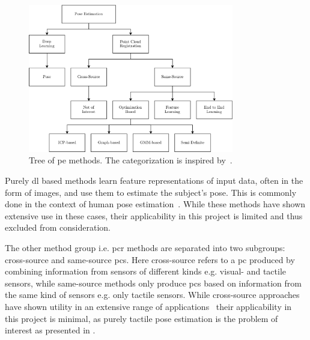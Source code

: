 \begin{figure}[h]
	\begin{small}
		\begin{center}
			\includegraphics[width=0.8\textwidth]{chapters/state-of-the-art/fig/pe-categories-v3.pdf}
		\end{center}
		\caption{Tree of \gls{pe} methods. The categorization is inspired by~\cite{a-comprehensive-survey-on-point-cloud-registration}.}
		\label{fig:pe-categories}
	\end{small}
\end{figure}

Purely \gls{dl} based methods learn feature representations of input data, often in the form of images, and use them to estimate the subject's pose. This is commonly done in the context of human pose estimation~\cite{hands-deep-in-deep-learning-for-hand-pose-estimation, deeppose:-human-pose-estimation-via-deep-neural-networks, deeplabcut:-markerless-pose-estimation-of-user-defined-body-parts-with-deep-learning}. While these methods have shown extensive use in these cases, their applicability in this project is limited and thus excluded from consideration. \medskip

The other method group i.e. \gls{pcr} methods are separated into two subgroups: cross-source and same-source \gls{pc}s. Here cross-source refers to a \gls{pc} produced by combining information from sensors of different kinds e.g. visual- and tactile sensors, while same-source methods only produce \gls{pc}s based on information from the same kind of sensors e.g. only tactile sensors. 
While cross-source approaches have shown utility in an extensive range of applications~\cite{a-systematic-approach-for-cross-source-point-cloud-registration-by-preserving-macro-and-micro-structures,a-coarse-to-fine-algorithm-for-matching-and-registration-in-3d-cross-source-point-clouds,a-comprehensive-survey-on-point-cloud-registration} their applicability in this project is minimal, as purely tactile pose estimation is the problem of interest as presented in . \medskip

